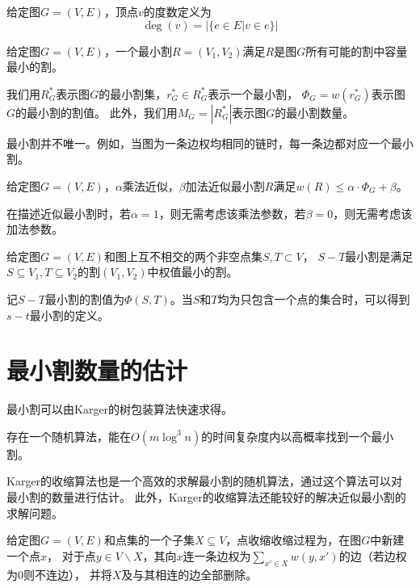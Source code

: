 \begin{definition}[点的度数]
    给定图$G=(V,E)$，顶点$v$的度数定义为
    \begin{equation*}
        \deg(v)=|\{e\in E|v\in e\}|
    \end{equation*}
\end{definition}
\begin{definition}
    给定图$G=(V,E)$，一个最小割$R=(V_1,V_2)$满足$R$是图$G$所有可能的割中容量最小的割。
\end{definition}
    我们用$R^*_{G}$表示图$G$的最小割集，$r^*_{G}\in R^*_{G}$表示一个最小割，
    $\Phi_G=w(r^*_{G})$表示图$G$的最小割的割值。
    此外，我们用$M_G=|R^*_{G}|$表示图$G$的最小割数量。

    最小割并不唯一。例如，当图为一条边权均相同的链时，每一条边都对应一个最小割。
\begin{definition}
    给定图$G=(V,E)$，$\alpha$乘法近似，$\beta$加法近似最小割$R$满足$w(R)\leq \alpha ·\Phi_G+\beta$。
\end{definition}
在描述近似最小割时，若$\alpha=1$，则无需考虑该乘法参数，若$\beta=0$，则无需考虑该加法参数。
\begin{definition}[$S-T$最小割]
    给定图$G=(V,E)$和图上互不相交的两个非空点集$S,T\subset V$，
    $S-T$最小割是满足$S\subseteq V_1,T\subseteq V_2$的割$(V_1,V_2)$中权值最小的割。
\end{definition}
记$S-T$最小割的割值为$\Phi(S,T)$。当$S$和$T$均为只包含一个点的集合时，可以得到$s-t$最小割的定义。


\section{最小割数量的估计}

最小割可以由Karger的树包装算法快速求得。

\begin{theorem}[最小割算法]\cite{karger2000minimum}
    \label{the:mincut}
    存在一个随机算法，能在$O(m\log^3n)$的时间复杂度内以高概率找到一个最小割。
\end{theorem}

Karger的收缩算法也是一个高效的求解最小割的随机算法，通过这个算法可以对最小割的数量进行估计。
此外，Karger的收缩算法还能较好的解决近似最小割的求解问题。

\begin{definition}[点收缩]
    给定图$G=(V,E)$和点集的一个子集$X\subseteq V$，点收缩收缩过程为，在图$G$中新建一个点$x$，
    对于点$y\in V\backslash X$，其向$x$连一条边权为$\sum_{x'\in X}w(y,x')$的边（若边权为$0$则不连边），
    并将$X$及与其相连的边全部删除。
\end{definition}

